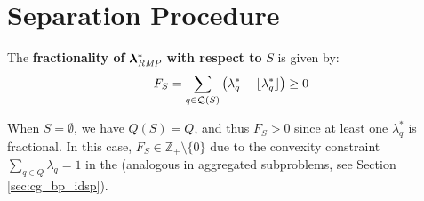 \section{Separation Procedure}\label{sec:cmpbnd_separation}
\begin{definition}
The \textbf{fractionality of} ${\bm{\lambda}}^*_{\textit{RMP}}{}$ \textbf{ with respect to } $S$ is given by:
\begin{equation}\label{eq:cmpbnd_fractionality}
F_S = \sum_{q \in \mathcal{Q}(S)} \left( \lambda_q^* - \lfloor\lambda_q^*\rfloor \right) \geq 0
\end{equation}
\end{definition}

When $S = \emptyset$, we have $Q(S) = Q$, and thus $F_S > 0$ since at least one $\lambda_q^*$ is fractional. In this case, $F_S \in \mathbb{Z}_+ \setminus \{0\}$ due to the convexity constraint $\sum_{q \in Q} \lambda_q = 1$ in the \MP{} (analogous in aggregated subproblems, see Section \ref{sec:cg_bp_idsp}).

